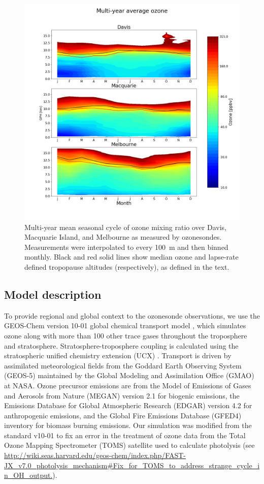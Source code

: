 \documentclass[acp, manuscript]{copernicus} %
\begin{document}
    \begin{figure}[t]
      \includegraphics[width=12.0cm]{figures/seasonaltropozone}
      \caption{ %
	Multi-year mean seasonal cycle of ozone mixing ratio over Davis, Macquarie Island, and Melbourne as measured by ozonesondes.
	Measurements were interpolated to every 100~m and then binned monthly.
	Black and red solid lines show median ozone and lapse-rate defined tropopause altitudes (respectively), as defined in the text. }
      \label{fig:seasonaltropozone}
    \end{figure}

  \subsection{Model description}
    \label{sec:GEOSChemDescription}
    To provide regional and global context to the ozonesonde observations, we use the GEOS-Chem version 10-01 global chemical transport model \citep{Bey2001}, which simulates ozone along with more than 100 other trace gases throughout the troposphere and stratosphere. 
    Stratosphere-troposphere coupling is calculated using the stratospheric unified chemistry extension (UCX) \citep{Eastham2014}.
    Transport is driven by assimilated meteorological fields from the Goddard Earth Observing System (GEOS-5) maintained by the Global Modeling and Assimilation Office (GMAO) at NASA.
    Ozone precursor emissions are from the Model of Emissions of Gases and Aerosols from Nature (MEGAN) version 2.1 \citep{Guenther2012} for biogenic emissions, the Emissions Database for Global Atmospheric Research (EDGAR) version 4.2 for anthropogenic emissions, and the Global Fire Emissions Database (GFED4) inventory \citep{Giglio2013} for biomass burning emissions. 
    Our simulation was modified from the standard v10-01 to fix an error in the treatment of ozone data from the Total Ozone Mapping Spectrometer (TOMS) satellite used to calculate photolysis (see \url{http://wiki.seas.harvard.edu/geos-chem/index.php/FAST-JX_v7.0_photolysis_mechanism#Fix_for_TOMS_to_address_strange_cycle_in_OH_output.}).  
\end{document}

